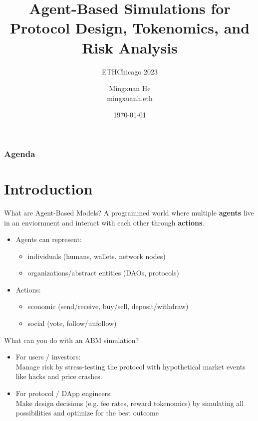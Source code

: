 \documentclass{beamer}
\title[ABM Workshop]{Agent-Based Simulations for Protocol Design, Tokenomics, and Risk Analysis}
\subtitle{ETHChicago 2023}
\author[Mingxuan He]{Mingxuan He\\
mingxuanh.eth}
\institute[]{
Phoenix graduate scholar (computational economics), University of Chicago\\
Research fellow, Nethermind
}
\date{\today}
\begin{document}
\begin{frame}
    \titlepage
\end{frame}

\begin{frame}
    \frametitle{Agenda}
    \tableofcontents
\end{frame}


\section{Introduction}
\begin{frame}{What are Agent-Based Models?}
    A programmed world where multiple \textbf{agents} live in an enviornment and interact with each other through \textbf{actions}.
    
    \begin{itemize}
        \item Agents can represent:
              \begin{itemize}
                  \item individuals (humans, wallets, network nodes)
                  \item organizations/abstract entities (DAOs, protocols)
              \end{itemize}
        \item Actions:
              \begin{itemize}
                  \item economic (send/receive, buy/sell, deposit/withdraw)
                  \item social (vote, follow/unfollow)
              \end{itemize}
    \end{itemize}
\end{frame}


\begin{frame}{What can you do with an ABM simulation?}

    \begin{itemize}
        \item For users / investors: \\
        Manage risk by stress-testing the protocol with hypothetical market events like hacks and price crashes.
              \bigskip
        \item For protocol / DApp engineers: \\
        Make design decisions (e.g. fee rates, reward tokenomics) by simulating all possibilities and optimize for the best outcome
    \end{itemize}
\end{frame}
\end{document}
